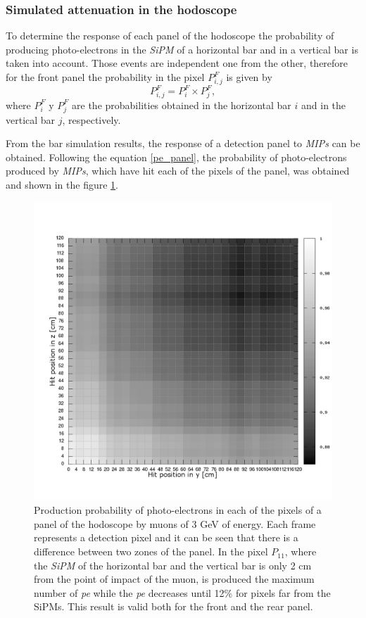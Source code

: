 \documentclass[submitting]{nst}
\begin{document}
\subsubsection{Simulated attenuation in the hodoscope}
\label{sec:hodoscope-response-two} %
To determine the response of each panel of the hodoscope the probability of producing photo-electrons in the \textsl{SiPM} of a horizontal bar and in a vertical bar is taken into account. Those events are independent one from the other, therefore for the front panel the probability in the pixel $P^{F}_{i,j}$ is given by 
\begin{equation}
\label{pe_panel}
P^{F}_{i,j}=P^{F}_{i} \times P^{F}_{j},
\end{equation}
where $P^{F}_{i}$ y $P^{F}_j$ are the probabilities obtained in the horizontal bar $i$ and in the vertical bar $j$, respectively.

From the bar simulation results, the response of a detection panel to \textsl{MIPs} can be obtained. Following the equation \ref{pe_panel}, the probability of photo-electrons produced by \textsl{MIPs}, which have hit each of the pixels of the panel, was obtained and shown in the figure \ref{atenuacion_panel_bw}.

\begin{figure}[h!]
    \centering
        \includegraphics[scale=0.3]{Figures/atenuacion_panel_bw.png}
   \caption[Response of the hodoscope panels]{Production probability of photo-electrons in each of the pixels of a panel of the hodoscope by muons of 3 GeV of energy. Each frame represents a detection pixel and it can be seen that there is a difference between two zones of the panel. In the pixel $P_{11}$, where the \textsl{SiPM} of the horizontal bar and the vertical bar is only 2 cm from the point of impact of the muon, is produced the maximum number of \textsl{pe} while the \textsl{pe} decreases until 12\% for pixels far from the SiPMs. This result is valid both for the front and the rear panel.}\label{atenuacion_panel_bw}
\end{figure}
\end{document}
